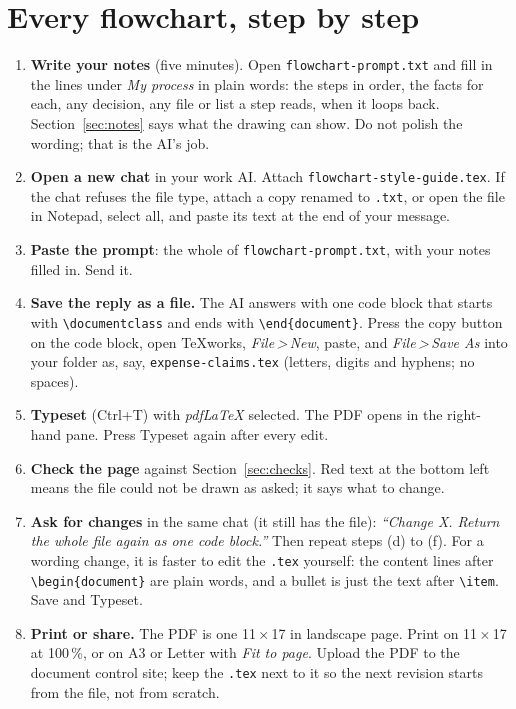 \documentclass[10pt]{article}
\newcommand{\menu}[1]{\textit{#1}}
\newcommand{\gt}{\,\textgreater\,}
\newcommand{\file}[1]{\texttt{#1}}
\begin{document}
\section{Every flowchart, step by step}\label{sec:steps}
\begin{enumerate}
\item \textbf{Write your notes} (five minutes). Open \file{flowchart-prompt.txt} and fill in the lines under \emph{My process} in plain words: the steps in order, the facts for each, any decision, any file or list a step reads, when it loops back. Section~\ref{sec:notes} says what the drawing can show. Do not polish the wording; that is the AI's job.
\item \textbf{Open a new chat} in your work AI. Attach \file{flowchart-style-guide.tex}. If the chat refuses the file type, attach a copy renamed to \file{.txt}, or open the file in Notepad, select all, and paste its text at the end of your message.
\item \textbf{Paste the prompt}: the whole of \file{flowchart-prompt.txt}, with your notes filled in. Send it.
\item \textbf{Save the reply as a file.} The AI answers with one code block that starts with \file{\textbackslash documentclass} and ends with \file{\textbackslash end\{document\}}. Press the copy button on the code block, open TeXworks, \menu{File\gt New}, paste, and \menu{File\gt Save As} into your folder as, say, \file{expense-claims.tex} (letters, digits and hyphens; no spaces).
\item \textbf{Typeset} (Ctrl+T) with \emph{pdfLaTeX} selected. The PDF opens in the right-hand pane. Press Typeset again after every edit.
\item \textbf{Check the page} against Section~\ref{sec:checks}. Red text at the bottom left means the file could not be drawn as asked; it says what to change.
\item \textbf{Ask for changes} in the same chat (it still has the file): \emph{``Change X. Return the whole file again as one code block.''} Then repeat steps (d) to (f). For a wording change, it is faster to edit the \file{.tex} yourself: the content lines after \file{\textbackslash begin\{document\}} are plain words, and a bullet is just the text after \file{\textbackslash item}. Save and Typeset.
\item \textbf{Print or share.} The PDF is one 11\,$\times$\,17 in landscape page. Print on 11\,$\times$\,17 at 100\,\%, or on A3 or Letter with \emph{Fit to page}. Upload the PDF to the document control site; keep the \file{.tex} next to it so the next revision starts from the file, not from scratch.
\end{enumerate}
\end{document}
